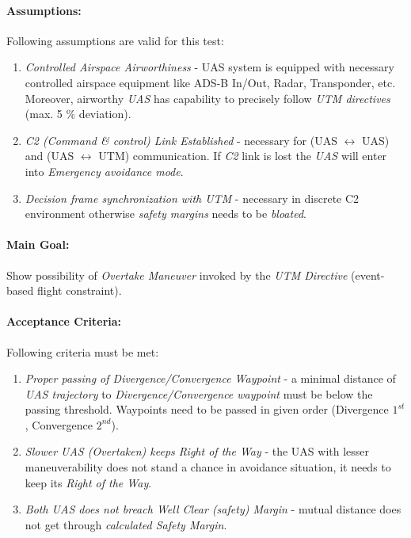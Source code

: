     \paragraph{Assumptions:} Following assumptions are valid for this test:
    
    \begin{enumerate}
        \item \emph{Controlled Airspace Airworthiness} - UAS system is equipped with necessary controlled airspace equipment like ADS-B In/Out, Radar, Transponder, etc. Moreover, airworthy \emph{UAS} has capability to precisely follow \emph{UTM directives} (max. 5 $\%$ deviation).
        
        \item \emph{C2 (Command \& control) Link Established} - necessary for (UAS $\leftrightarrow$ UAS) and (UAS $\leftrightarrow$ UTM) communication. If \emph{C2} link is lost the \emph{UAS} will enter into \emph{Emergency avoidance mode}.
        
        \item \emph{Decision frame synchronization with UTM} - necessary in discrete C2 environment otherwise \emph{safety margins} needs to be \emph{bloated}.
    \end{enumerate}
    
    \paragraph{Main Goal:} Show possibility of \emph{Overtake Maneuver} invoked by the \emph{UTM Directive} (event-based flight constraint). 
    
    \paragraph{Acceptance Criteria:} Following criteria must be met:
    \begin{enumerate}
        \item \emph{Proper passing of Divergence/Convergence Waypoint} - a minimal distance of \emph{UAS trajectory} to \emph{Divergence/Convergence waypoint} must be below the passing threshold. Waypoints need to be passed in given order (Divergence $1^{st}$, Convergence $2^{nd}$).
        
        \item \emph{Slower UAS (Overtaken) keeps Right of the Way} - the UAS with lesser maneuverability does not stand a chance in avoidance situation, it needs to keep its \emph{Right of the Way}. 
        
        \item \emph{Both UAS does not breach Well Clear (safety) Margin} - mutual distance does not get through \emph{calculated Safety Margin}.
    \end{enumerate}
    
